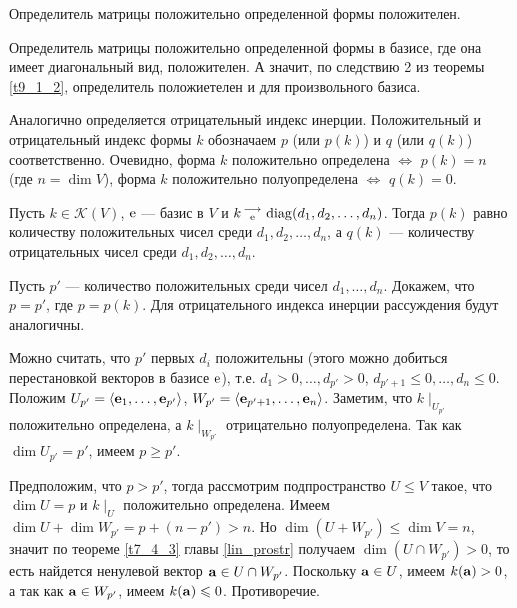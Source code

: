 \begin{sled}
Определитель матрицы положительно определенной формы положителен.
\end{sled}
\dok 
Определитель матрицы положительно определенной формы в базисе, где она имеет диагональный вид, положителен.
А значит, по следствию 2 из теоремы \ref{t9_1_2}, определитель положиетелен и для произвольного базиса.
\edok




Аналогично определяется отрицательный индекс инерции. Положительный и отрицательный индекс формы $k$ обозначаем $p$ (или $p(k)$) и $q$ (или $q(k)$) соответственно.
Очевидно, форма $k$ положительно определена $\Leftrightarrow$ $p(k) = n$ (где $n=\dim V$), форма $k$ положительно полуопределена 
$\Leftrightarrow$ $q(k) = 0$.


\begin{theor}\label{t9_4_2}
Пусть $k\in \mathcal{K}(V)$, $\mathrm{e}$ --- базис в $V$ и $k \begin{smallmatrix} \longrightarrow \\ \mathrm{e} \end{smallmatrix} \mathop{\rm diag}\nolimits (d_1, d_2, \ldots, d_n)$. Тогда
$p(k)$ равно количеству положительных чисел среди $d_1, d_2, \ldots, d_n$, а $q(k)$ --- количеству отрицательных чисел среди $d_1, d_2, \ldots, d_n$.
\end{theor}
\dok Пусть $p'$ --- количество положительных среди чисел $d_1, \ldots, d_n$. Докажем, что $p=p'$, где $p=p(k)$. Для отрицательного индекса инерции рассуждения будут аналогичны.

Можно считать, что $p'$ первых $d_i$ положительны (этого можно добиться перестановкой векторов в базисе $\mathrm{e}$),
т.е. $d_1>0, \ldots, d_{p'}>0$, $d_{p'+1}\leq 0, \ldots,  d_n\leq 0$.
Положим $U_{p'} = \langle \mathbf{e}_1, \ldots, \mathbf{e}_{p'} \rangle$, $W_{p'} = \langle \mathbf{e}_{p'+1}, \ldots, \mathbf{e}_{n} \rangle$.
Заметим, что  $k \mid_{U_{p'}}$  положительно определена, а $k \mid_{W_{p'}}$ отрицательно полуопределена.
Так как $\dim U_{p'}=p'$, имеем $p\geq p'$. 

Предположим, что $p>p'$, тогда рассмотрим подпространство $U\leq V$ такое, что $\dim U=p$ и $k \mid_{U}$  положительно определена.
Имеем $\dim U+\dim W_{p'} = p+(n-p') >n $. Но $\dim (U+W_{p'}) \leq \dim V = n$, значит по теореме \ref{t7_4_3} главы \ref{lin_prostr}
получаем $\dim (U\cap W_{p'})>0$, то есть найдется ненулевой вектор $\mathbf{a}\in U\cap W_{p'}$.
Поскольку $\mathbf{a}\in U$, имеем $k(\mathbf{a})>0$, а так как $\mathbf{a}\in W_{p'}$, имеем $k(\mathbf{a})\leqslant 0$. Противоречие.
\edok


